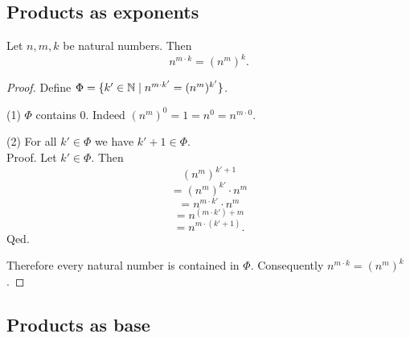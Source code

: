 \documentclass[../arithmetic.tex]{subfiles}
\begin{document}
  \subsection*{Products as exponents}

  \begin{forthel}
    \begin{proposition}
      Let $n, m, k$ be natural numbers.
      Then \[ n^{m \cdot k} = (n^{m})^{k}. \]
    \end{proposition}
    \begin{proof}
      Define $\Phi = \{ k' \in \mathbb{N} \mid n^{m \cdot k'} = (n^{m})^{k'} \}$.

      (1) $\Phi$ contains $0$.
      Indeed $(n^{m})^{0}
        = 1
        = n^{0}
        = n^{m \cdot 0}$.

      (2) For all $k' \in \Phi$ we have $k' + 1 \in \Phi$. \\
      Proof.
        Let $k' \in \Phi$.
        Then
        \[  (n^{m})^{k' + 1}                \]
        \[    = (n^{m})^{k'} \cdot n^{m}    \]
        \[    = n^{m \cdot k'} \cdot n^{m}  \]
        \[    = n^{(m \cdot k') + m}        \]
        \[    = n^{m \cdot (k' + 1)}.       \]
      Qed.

      Therefore every natural number is contained in $\Phi$.
      Consequently $n^{m \cdot k} = (n^{m})^{k}$.
    \end{proof}
  \end{forthel}


  \subsection*{Products as base}
\end{document}
